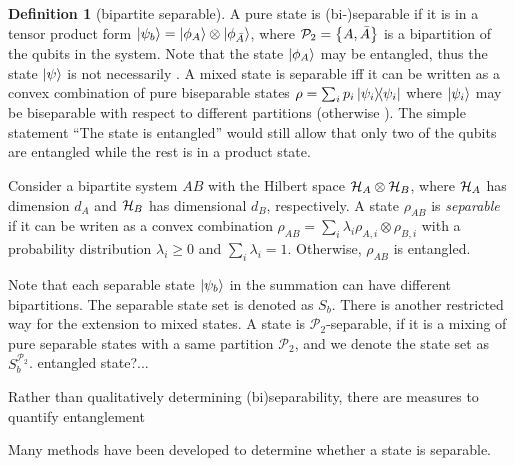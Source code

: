 \documentclass[
aps,
pra,
floatfix,
]{revtex4-2}
\theoremstyle{plain}
\theoremstyle{definition}
\newtheorem{definition}{Definition}
\newtheorem{example}{Example}
\newcommand{\ppartition}{\mathcal{P}}
\newcommand{\dm}{\rho}
\begin{document}
\begin{definition}[bipartite separable]\label{def:bipartite_separable}
	A pure state is (bi-)separable if it is in a tensor product form $\ket{\psi_b}=\ket{\phi_A}\otimes\ket{\phi_{\bar{A}}}$, 
	where $\ppartition_2 = \qty{ A, \bar{A} }$ is a bipartition of the qubits in the system.
	Note that the state $\ket{\phi_A}$ may be entangled, thus the state $\ket{\psi}$ is not necessarily .
	A mixed state is separable iff it can be written as a convex combination of pure biseparable states $\dm=\sum_i p_i \op{\psi_i}$ where $\ket{\psi_i}$ may be biseparable with respect to different partitions (otherwise ).
	The simple statement “The state is entangled” would still allow that only two of the qubits are entangled while the rest is in a product state.

	Consider a bipartite system $AB$ with the Hilbert space $\mathcal{H}_A \otimes \mathcal{H}_B$, where $\mathcal{H}_A$ has dimension $d_A$ and $\mathcal{H}_B$ has dimensional $d_B$, respectively.
	A state $\dm_{AB}$ is \emph{separable} if it can be writen as a convex combination $\dm_{AB}= \sum_i \lambda_i \dm_{A,i} \otimes \dm_{B,i}$ with a probability distribution $\lambda_i\ge 0$ and $\sum_i \lambda_i = 1$. Otherwise, $\dm_{AB}$ is entangled.

	Note that each separable state $\ket{\psi_b}$ in the summation can have different bipartitions.
	The separable state set is denoted as $S_b$.
	There is another restricted way for the extension to mixed states. 
	A state is $\ppartition_2$-separable, if it is a mixing of pure separable states with a same partition $\ppartition_2$, 
	and we denote the state set as $S_b^{\ppartition_2}$. 
	entangled state?...
\end{definition}

Rather than qualitatively determining (bi)separability, there are measures to quantify entanglement




Many methods \cite{tothEntanglementDetectionStabilizer2005} have been developed to determine whether a state is separable.
\end{document}
